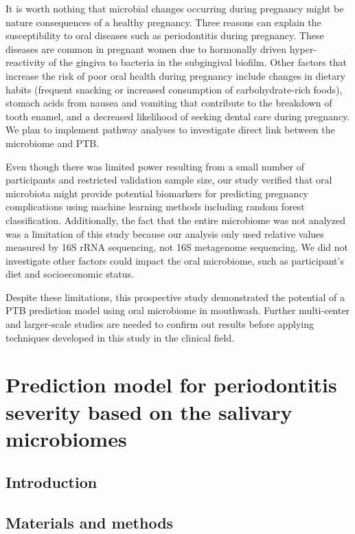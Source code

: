 \documentclass[11pt, a4paper, onecolumn, oneside]{report}
\begin{document}
            It is worth nothing that microbial changes occurring during pregnancy might be nature consequences of a healthy pregnancy. Three reasons can explain the susceptibility to oral diseases such as periodontitis during pregnancy. These diseases are common in pregnant women due to hormonally driven hyper-reactivity of the gingiva to bacteria in the subgingival biofilm. Other factors that increase the risk of poor oral health during pregnancy include changes in dietary habits (frequent snacking or increased consumption of carbohydrate-rich foods), stomach acids from nausea and vomiting that contribute to the breakdown of tooth enamel, and a decreased likelihood of seeking dental care during pregnancy. We plan to implement pathway analyses to investigate direct link between the microbiome and PTB.

            Even though there was limited power resulting from a small number of participants and restricted validation sample size, our study verified that oral microbiota might provide potential biomarkers for predicting pregnancy complications using machine learning methods including random forest classification. Additionally, the fact that the entire microbiome was not analyzed was a limitation of this study because our analysis only used relative values measured by 16S rRNA sequencing, not 16S metagenome sequencing. We did not investigate other factors could impact the oral microbiome, such as participant’s diet and socioeconomic status.

            Despite these limitations, this prospective study demonstrated the potential of a PTB prediction model using oral microbiome in mouthwash. Further multi-center and larger-scale studies are needed to confirm out results before applying techniques developed in this study in the clinical field.
        \newpage

    \section{Prediction model for periodontitis severity based on the salivary microbiomes}
        \label{section:Periodontitis}
        \subsection{Introduction}
        \newpage

        \subsection{Materials and methods}
\end{document}
